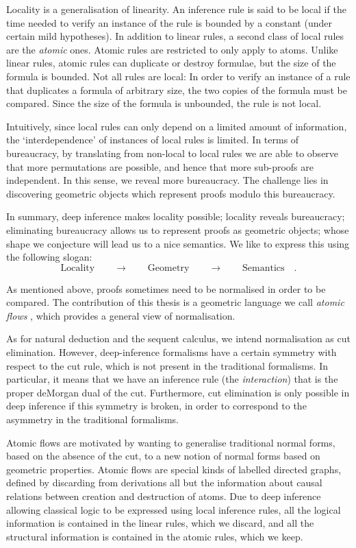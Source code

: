 Locality is a generalisation of linearity. An inference rule is said to be local if the time needed to verify an instance of the rule is bounded by a constant (under certain mild hypotheses). In addition to linear rules, a second class of local rules are the \emph{atomic} ones. Atomic rules are restricted to only apply to atoms. Unlike linear rules, atomic rules can duplicate or destroy formulae, but the size of the formula is bounded. Not all rules are local: In order to verify an instance of a rule that duplicates a formula of arbitrary size, the two copies of the formula must be compared. Since the size of the formula is unbounded, the rule is not local.

Intuitively, since local rules can only depend on a limited amount of information, the `interdependence' of instances of local rules is limited. In terms of bureaucracy, by translating from non-local to local rules we are able to observe that more permutations are possible, and hence that more sub-proofs are independent. In this sense, we reveal more bureaucracy. The challenge lies in discovering geometric objects which represent proofs modulo this bureaucracy.

In summary, deep inference makes locality possible; locality reveals bureaucracy; eliminating bureaucracy allows us to represent proofs as geometric objects; whose shape we conjecture will lead us to a nice semantics. We like to express this using the following slogan:
\[
\mbox{Locality}\qquad\rightarrow\qquad\mbox{Geometry}\qquad\rightarrow\qquad\mbox{Semantics}\quad.
\]

As mentioned above, proofs sometimes need to be normalised in order to be compared. The contribution of this thesis is a geometric language we call \emph{atomic flows} \cite{GuglGund:07:Normalis:lr}, which provides a general view of normalisation.

As for natural deduction and the sequent calculus, we intend normalisation as cut elimination. However, deep-inference formalisms have a certain symmetry with respect to the cut rule, which is not present in the traditional formalisms. In particular, it means that we have an inference rule (the \emph{interaction}) that is the proper deMorgan dual of the cut. Furthermore, cut elimination is only possible in deep inference if this symmetry is broken, in order to correspond to the asymmetry in the traditional formalisms.

Atomic flows are motivated by wanting to generalise traditional normal forms, based on the absence of the cut, to a new notion of normal forms based on geometric properties. Atomic flows are special kinds of labelled directed graphs, defined by discarding from derivations all but the information about causal relations between creation and destruction of atoms. Due to deep inference allowing classical logic to be expressed using local inference rules, all the logical information is contained in the linear rules, which we discard, and all the structural information is contained in the atomic rules, which we keep.

